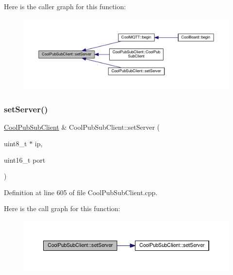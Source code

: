 Here is the caller graph for this function\+:\nopagebreak
\begin{figure}[H]
\begin{center}
\leavevmode
\includegraphics[width=350pt]{class_cool_pub_sub_client_a947e70c394c66c7d08d0c53caf8425e3_icgraph}
\end{center}
\end{figure}
\mbox{\label{class_cool_pub_sub_client_ad589f977fc2799b9341dc5f4fcdb483a}} 
\subsubsection{\texorpdfstring{set\+Server()}{setServer()}\hspace{0.1cm}{\footnotesize\ttfamily [2/3]}}
{\footnotesize\ttfamily \hyperlink{class_cool_pub_sub_client}{Cool\+Pub\+Sub\+Client} \& Cool\+Pub\+Sub\+Client\+::set\+Server (\begin{DoxyParamCaption}\item[{uint8\+\_\+t $\ast$}]{ip,  }\item[{uint16\+\_\+t}]{port }\end{DoxyParamCaption})}



Definition at line 605 of file Cool\+Pub\+Sub\+Client.\+cpp.

Here is the call graph for this function\+:\nopagebreak
\begin{figure}[H]
\begin{center}
\leavevmode
\includegraphics[width=350pt]{class_cool_pub_sub_client_ad589f977fc2799b9341dc5f4fcdb483a_cgraph}
\end{center}
\end{figure}
\mbox{\label{class_cool_pub_sub_client_a333ea9369dc88bb14d3fa6216e731c09}} 
